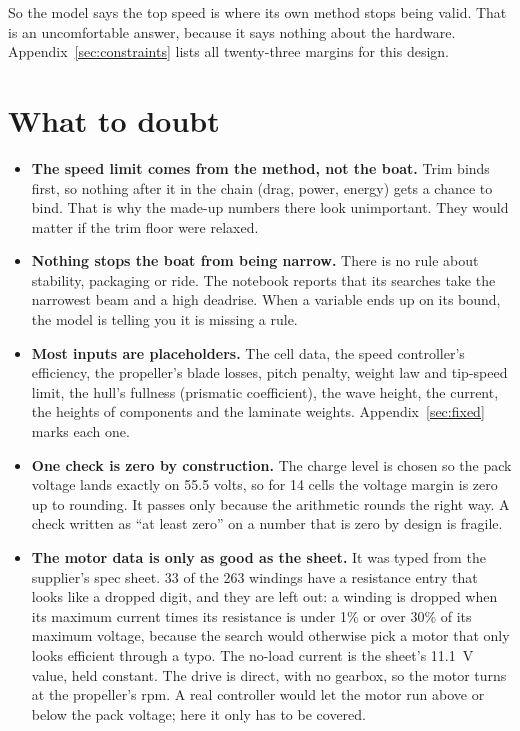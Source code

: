 \documentclass[11pt,a4paper]{article}
\renewcommand{\_}{\textunderscore\allowbreak}
\begin{document}
So the model says the top speed is where its own method stops being valid. That is an uncomfortable answer, because it says nothing about the hardware. Appendix~\ref{sec:constraints} lists all twenty-three margins for this design.

\section*{What to doubt}
\label{sec:caveats}

\begin{itemize}
  \item \textbf{The speed limit comes from the method, not the boat.} Trim binds first, so nothing after it in the chain (drag, power, energy) gets a chance to bind. That is why the made-up numbers there look unimportant.
        They would matter if the trim floor were relaxed.
  \item \textbf{Nothing stops the boat from being narrow.} There is no rule about stability, packaging or ride. The notebook reports that its searches take the narrowest beam and a high deadrise. When a variable ends up on its bound,
        the model is telling you it is missing a rule.
  \item \textbf{Most inputs are placeholders.} The cell data, the speed controller's efficiency, the propeller's blade losses, pitch penalty, weight law and tip-speed limit, the hull's fullness (prismatic coefficient), the wave height, the current, the heights of components and the laminate weights.
        Appendix~\ref{sec:fixed} marks each one.
  \item \textbf{One check is zero by construction.} The charge level is chosen so the pack voltage lands exactly on 55.5 volts, so for 14 cells the voltage margin is zero up to rounding. It passes only because the arithmetic rounds the right way.
        A check written as ``at least zero'' on a number that is zero by design is fragile.
  \item \textbf{The motor data is only as good as the sheet.} It was typed from the supplier's spec sheet. 33 of the 263 windings have a resistance entry that looks like a dropped digit, and they are left out: a winding is dropped when its maximum current times its resistance is under 1\% or over 30\% of its maximum voltage, because the search would otherwise pick a motor that only looks efficient through a typo. The no-load current is the sheet's 11.1~V value, held constant. The drive is direct, with no gearbox, so the motor turns at the propeller's rpm. A real controller would let the motor run above or below the pack voltage; here it only has to be covered.

\end{itemize}
\end{document}
